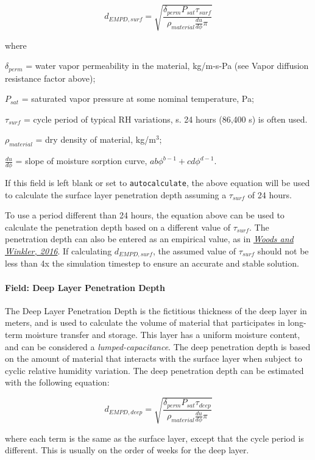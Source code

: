 \[ d_{EMPD,surf} = \sqrt{\frac{\delta_{perm} P_{sat} \tau_{surf}}{\rho_{material} \frac{du}{d\phi} \pi}} \]

where

\(\delta_{perm}\) = water vapor permeability in the material, kg/m-s-Pa (see Vapor diffusion resistance factor above);

\(P_{sat}\) = saturated vapor pressure at some nominal temperature, Pa;

\(\tau_{surf}\) = cycle period of typical RH variations, s. 24 hours (86,400 s) is often used.

\(\rho_{material}\) = dry density of material, kg/m$^3$;

\(\frac{du}{d\phi}\) = slope of moisture sorption curve, \(a b \phi^{b-1} + c d \phi^{d-1}\).

If this field is left blank or set to \texttt{autocalculate}, the above equation will be used to calculate the surface layer penetration depth assuming a $\tau_{surf}$ of 24 hours.

To use a period different than 24 hours, the equation above can be used to calculate the penetration depth based on a different value of $\tau_{surf}$. The penetration depth can also be entered as an empirical value, as in \href{http://dx.doi.org/10.1016/j.enbuild.2016.02.008}{\emph{Woods and Winkler, 2016}}. If calculating $d_{EMPD,surf}$, the assumed value of $\tau_{surf}$ should not be less than 4x the simulation timestep to ensure an accurate and stable solution.

\paragraph{Field: Deep Layer Penetration Depth}\label{field-deep-layer-penetration-depth}

The Deep Layer Penetration Depth is the fictitious thickness of the deep layer in meters, and is used to calculate the volume of material that participates in long-term moisture transfer and storage. This layer has a uniform moisture content, and can be considered a \emph{lumped-capacitance}. The deep penetration depth is based on the amount of material that interacts with the surface layer when subject to cyclic relative humidity variation. The deep penetration depth can be estimated with the following equation:

\[ d_{EMPD,deep} = \sqrt{\frac{\delta_{perm} P_{sat} \tau_{deep}} {\rho_{material} \frac{du}{d\phi} \pi}} \]

where each term is the same as the surface layer, except that the cycle period is different. This is usually on the order of weeks for the deep layer.

